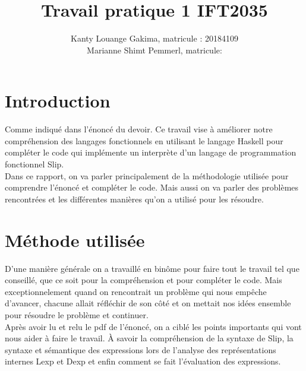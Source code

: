 \documentclass{article}
\title{Travail pratique 1 IFT2035}
\author{Kanty Louange Gakima, matricule : 20184109 \\ Marianne Shimt Pemmerl, matricule: }
\begin{document}
\maketitle

\newcommand \mML {\ensuremath\mu\textsl{ML}}
\newcommand \kw [1] {\textsf{#1}}
\newcommand \id [1] {\textsl{#1}}
\newcommand \punc [1] {\kw{`#1'}}
\newcommand \str [1] {\texttt{"#1"}}
\newenvironment{outitemize}{
  \begin{itemize}
  \let \origitem \item \def \item {\origitem[]\hspace{-18pt}}
}{
  \end{itemize}
}
\newcommand \Align [2][t] {
  \begin{array}[#1]{@{}l}
    #2
  \end{array}}

\section{Introduction}


Comme indiqué dans l'énoncé du devoir. Ce travail vise à améliorer notre compréhension des langages fonctionnels en utilisant le langage Haskell pour compléter le code qui implémente un interprète d'un langage de programmation fonctionnel Slip.\\ 
Dans ce rapport, on va parler principalement de la méthodologie utilisée pour comprendre l'énoncé et compléter le code. Mais aussi on va parler des problèmes rencontrées et les différentes manières qu'on a utilisé pour les résoudre.

\section{Méthode utilisée}
D'une manière générale on a travaillé en binôme pour faire tout le travail tel que conseillé, que ce soit pour la compréhension et pour compléter le code. Mais exceptionnelement quand on rencontrait un problème qui nous empêche d'avancer, chacune allait réfléchir de son côté et on mettait nos idées ensemble pour résoudre le problème et continuer.\\

Après avoir lu et relu le pdf de l'énoncé, on a ciblé les points importants qui vont nous aider à faire le travail.
À savoir la compréhension de la syntaxe de Slip, la syntaxe et sémantique des expressions lors de l’analyse des représentations internes Lexp et Dexp et enfin comment se fait l'évaluation des expressions. 
\end{document}
